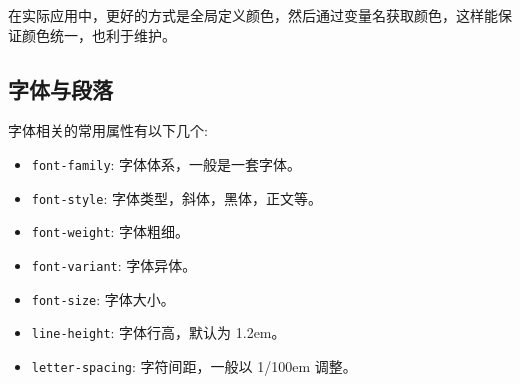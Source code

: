 在实际应用中，更好的方式是全局定义颜色，然后通过变量名获取颜色，这样能保证颜色统一，也利于维护。

\subsection{字体与段落}

字体相关的常用属性有以下几个:
\begin{itemize}
    \item \texttt{font-family}: 字体体系，一般是一套字体。
    \item \texttt{font-style}: 字体类型，斜体，黑体，正文等。
    \item \texttt{font-weight}: 字体粗细。
    \item \texttt{font-variant}: 字体异体。
    \item \texttt{font-size}: 字体大小。
    \item \texttt{line-height}: 字体行高，默认为 1.2em。
    \item \texttt{letter-spacing}: 字符间距，一般以 1/100em 调整。
\end{itemize}

\newpage